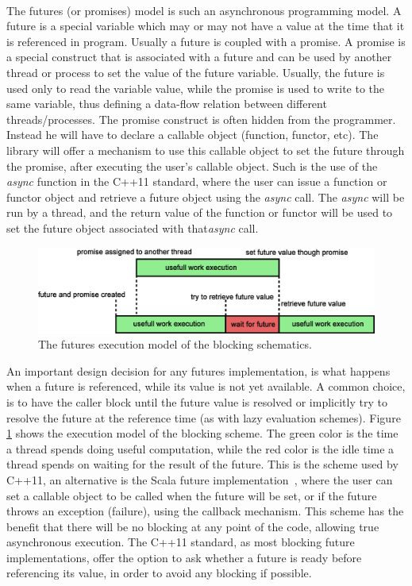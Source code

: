 \paragraph{}
The futures (or promises) model is such an asynchronous programming model.  A future is a special variable which may 
or may not have a value at the time that it is referenced in program.  Usually a future is coupled with a promise.  
A promise is a special construct that is associated with a future and can be used by another thread or process to 
set the value of the future variable.  Usually, the future is used only to read the variable value, while the 
promise is used to write to the same variable, thus defining a data-flow relation between different threads/processes.
The promise construct is often hidden from the programmer. Instead he will have to declare a callable object
(function, functor, etc).  The library will offer a mechanism to use this callable object to set the future through 
the promise, after executing the user's callable object.  Such is the use of the \emph{async} function in the C++11 
standard, where the user can issue a function or functor object and retrieve a future object using the \emph{async} call.
The \emph{async} will be run by a thread, and the return value of the function or functor will be used to set the future object 
associated with that\emph{async} call.   

\begin{figure}[!ht]
\includegraphics[width=\columnwidth]{figures/futures_blocking}
\caption{
The futures execution model of the blocking schematics.}
\label{fig:futures_blocking}
\end{figure}

An important design decision for any futures implementation, is what happens when a future is referenced, while its value
is not yet available.  A common choice, is to have the caller block until the future value is resolved or implicitly
try to resolve the future at the reference time (as with lazy evaluation schemes).  Figure \ref{fig:futures_blocking} 
shows the execution model of the blocking scheme.  The green color is the time a thread spends doing useful computation, 
while the red color is the idle time a thread spends on waiting for the result of the future. This is the scheme used by C++11, 
an alternative is the Scala future implementation~\cite{Scala:Futures}, where the user can set a callable object to be
called when the future will be set, or if the future throws an exception (failure), using the callback mechanism.  This scheme
has the benefit that there will be no blocking at any point of the code, allowing true asynchronous execution.  The C++11
standard, as most blocking future implementations, offer the option to ask whether a future is ready before referencing its 
value, in order to avoid any blocking if possible. 

